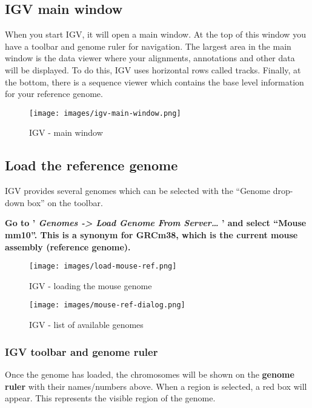\documentclass[11pt]{article}
\begin{document}
    \hypertarget{igv-main-window}{%
\subsection{IGV main window}\label{igv-main-window}}

When you start IGV, it will open a main window. At the top of this
window you have a toolbar and genome ruler for navigation. The largest
area in the main window is the data viewer where your alignments,
annotations and other data will be displayed. To do this, IGV uses
horizontal rows called tracks. Finally, at the bottom, there is a
sequence viewer which contains the base level information for your
reference genome.

    \begin{figure}
\centering
\texttt{[image: images/igv-main-window.png]}
\caption{IGV - main window}
\end{figure}

    \hypertarget{load-the-reference-genome}{%
\subsection{Load the reference genome}\label{load-the-reference-genome}}

IGV provides several genomes which can be selected with the ``Genome
drop-down box'' on the toolbar.

\textbf{Go to ' \textit{Genomes -\textgreater{} Load Genome From
Server\ldots{}} ' and select ``Mouse mm10''. This is a synonym for
GRCm38, which is the current mouse assembly (reference genome).}

    \begin{figure}
\centering
\texttt{[image: images/load-mouse-ref.png]}
\caption{IGV - loading the mouse genome}
\end{figure}

    \begin{figure}
\centering
\texttt{[image: images/mouse-ref-dialog.png]}
\caption{IGV - list of available genomes}
\end{figure}

    \hypertarget{igv-toolbar-and-genome-ruler}{%
\subsubsection{IGV toolbar and genome
ruler}\label{igv-toolbar-and-genome-ruler}}

Once the genome has loaded, the chromosomes will be shown on the
\textbf{genome ruler} with their names/numbers above. When a region is
selected, a red box will appear. This represents the visible region of
the genome.
\end{document}
